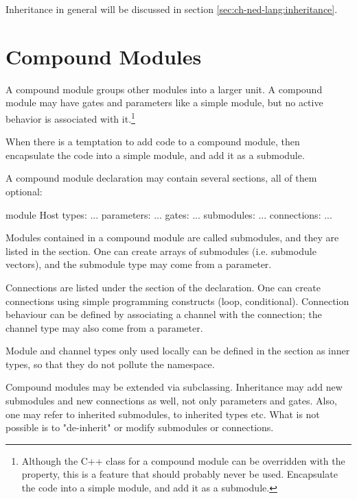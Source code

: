 Inheritance in general will be discussed in section \ref{sec:ch-ned-lang:inheritance}.



\section{Compound Modules}
\label{sec:ch-ned-lang:compound-modules}

A compound module groups other modules into a larger unit. A compound
module may have gates and parameters like a simple module, but no active
behavior is associated with it.\footnote{Although the C++ class
for a compound module can be overridden with the  property,
this is a feature that should probably never be used. Encapsulate the code
into a simple module, and add it as a submodule.}

\begin{note}
    When there is a temptation to add code to a compound module,
    then encapsulate the code into a simple module, and add it as
    a submodule.
\end{note}

A compound module declaration may contain several sections,
all of them optional:

\begin{ned}
module Host
{
   types:
       ...
   parameters:
       ...
   gates:
       ...
   submodules:
       ...
   connections:
       ...
}
\end{ned}

Modules contained in a compound module are called submodules, and they are
listed in the  section. One can create arrays of submodules
(i.e. submodule vectors), and the submodule type may come from a parameter.

Connections are listed under the  section of the
declaration. One can create connections using simple programming constructs
(loop, conditional). Connection behaviour can be defined by associating a
channel with the connection; the channel type may also come from a
parameter.

Module and channel types only used locally can be defined in the
 section as inner types, so that they do not pollute the
namespace.

Compound modules may be extended via subclassing. Inheritance may add new
submodules and new connections as well, not only parameters and gates.
Also, one may refer to inherited submodules, to inherited types etc. What
is not possible is to "de-inherit" or modify submodules or connections.

